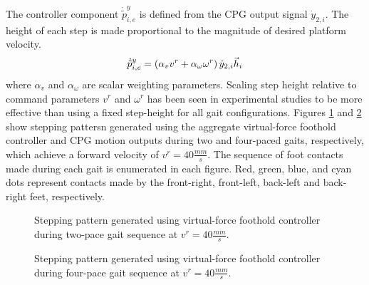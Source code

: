 		The controller component $\dot{\tilde{p}}_{i,e}^{y}$ is defined from the CPG output signal $\dot{y}_{2,i}$. The height of each step is made proportional to the magnitude of desired platform velocity.
		\begin{equation}
			\dot{\tilde{p}}_{i,e}^{y} 	= { \left( \alpha_{v} v^{r}+\alpha_{\omega} \omega^{r} \right) \dot{y}_{2,i}} \vec{h}_{i} 
			\label{eq::FootControl}
		\end{equation}
		where $\alpha_{v}$ and $\alpha_{\omega}$ are scalar weighting parameters. Scaling step height relative to command parameters $v^{r}$ and $\omega^{r}$ has been seen in experimental studies to be more effective than using a fixed step-height for all gait configurations. Figures \ref{fig::foot_motion2} and \ref{fig::foot_motion4} show stepping pattersn generated using the aggregate virtual-force foothold controller and CPG motion outputs during two and four-paced gaits, respectively, which achieve a forward velocity of $v^{r}=40\frac{mm}{s}$. The sequence of foot contacts made during each gait is enumerated in each figure. Red, green, blue, and cyan dots represent contacts made by the front-right, front-left, back-left and back-right feet, respectively.
%
			\begin{figure}[h!]
				\centering
				\caption{Stepping pattern generated using virtual-force foothold controller during two-pace gait sequence at $v^{r}=40\frac{mm}{s}$.}
				\label{fig::foot_motion2}
			\end{figure}
			\begin{figure}[h!]
				\centering
				\caption{Stepping pattern generated using virtual-force foothold controller during four-pace gait sequence at $v^{r}=40\frac{mm}{s}$.}
				\label{fig::foot_motion4}
			\end{figure}
%



